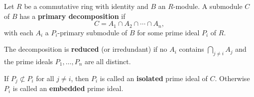 Let $R$ be a commutative ring with identity and $B$ an $R$-module. A submodule $C$ of $B$ has a \textbf{primary decomposition} if
\[
C = A_1 \cap A_2 \cap \cdots \cap A_n,
\]
with each $A_i$ a $P_i$-primary submodule of $B$ for some prime ideal $P_i$ of $R$.

The decomposition is \textbf{reduced} (or irredundant) if no $A_i$ contains $\bigcap_{j \neq i} A_j$ and the prime ideals $P_1, \ldots, P_n$ are all distinct.

If $P_j \not\subset P_i$ for all $j \neq i$, then $P_i$ is called an \textbf{isolated} prime ideal of $C$. Otherwise $P_i$ is called an \textbf{embedded} prime ideal.
